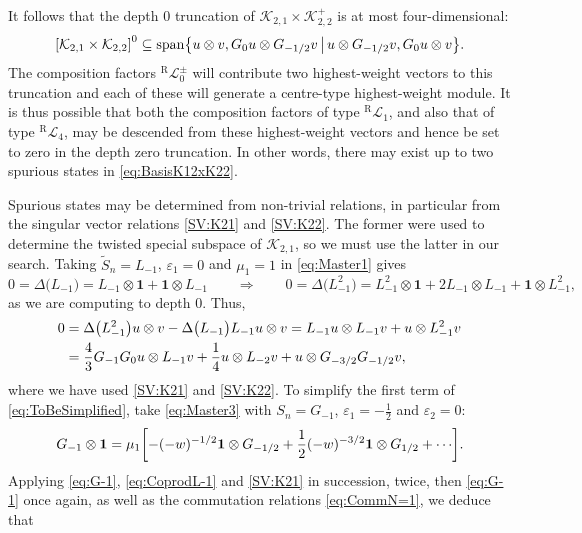 \documentclass[a4paper,reqno,12pt]{report}
\theoremstyle{definition}
\numberwithin{equation}{section}
\let\originalleft\left     %
\let\originalright\right
\renewcommand{\left}{\mathopen{}\mathclose\bgroup\originalleft}
\renewcommand{\right}{\aftergroup\egroup\originalright}
\newcommand{\sqbrac}[1]{\left[ #1 \right]}
\newcommand{\wun}{\mathbf{1}}  %
\newcommand{\Ra}{\Rightarrow}
\newcommand{\Irr}[1]{\mathcal{L}_{#1}}       %
\newcommand{\Kac}[1]{\mathcal{K}_{#1}}       %
\newcommand{\fuse}{\mathbin{\times}}                                            %
\newcommand{\coproductsymb}{\Delta}                                                %
\newcommand{\coproduct}[1]{\coproductsymb \bigl( #1 \bigr)}                        %
\newcommand{\hw}{highest-weight}
\newcommand{\sv}{singular vector}
\newcommand{\hwm}{\hw{} module}
\newcommand{\eps}{\varepsilon}
\newcommand{\tS}{\widetilde{S}}
\DeclareMathOperator{\vspn}{span}
\theoremstyle{plain}
\newcommand{\RIrr}[1]{{}^{\text{R}}\Irr{#1}}       %
\newcommand{\bfset}[2]{\left\{ #1 \, \middle\vert \, #2 \right\}} %
\newcommand{\hwvs}{\hw{} vectors}
\begin{document}
It follows that the depth $0$ truncation of $\Kac{2,1} \fuse \Kac{2,2}^+$ is at most four-dimensional:
\begin{equation} \label{eq:BasisK12xK22}
\sqbrac{\Kac{2,1} \fuse \Kac{2,2}}^0 \subseteq \vspn \bfset{u \otimes v, G_0 u \otimes G_{-1/2} v}{u\otimes  G_{-1/2}v, G_0 u \otimes v}.
\end{equation}
The composition factors $\RIrr{0}^{\pm}$ will contribute two \hwvs{} to this truncation and each of these will generate a centre-type \hwm{}.  It is thus possible that both the composition factors of type $\RIrr{1}$, and also that of type $\RIrr{4}$, may be descended from these \hwvs{} and hence be set to zero in the depth zero truncation.  In other words, there may exist up to two spurious states in \eqref{eq:BasisK12xK22}.

Spurious states may be determined from non-trivial relations, in particular from the \sv{} relations \eqref{SV:K21} and \eqref{SV:K22}.  The former were used to determine the twisted special subspace of $\Kac{2,1}$, so we must use the latter in our search.  Taking $\tS_n = L_{-1}$, $\eps_1 = 0$ and $\mu_1 = 1$ in \eqref{eq:Master1} gives
\begin{equation} \label{eq:CoprodL-1}
0 = \coproduct{L_{-1}} = L_{-1} \otimes \wun + \wun \otimes L_{-1} \qquad \Ra \qquad 
0 = \coproduct{L_{-1}^2} = L_{-1}^2 \otimes \wun + 2 L_{-1} \otimes L_{-1} + \wun \otimes L_{-1}^2,
\end{equation}
as we are computing to depth $0$.  Thus,
\begin{align} \label{eq:ToBeSimplified}
0 &= \coproduct{L_{-1}^2} u \otimes v - \coproduct{L_{-1}} L_{-1} u \otimes v = L_{-1} u \otimes L_{-1} v + u \otimes L_{-1}^2 v \notag \\
&= \frac{4}{3} G_{-1} G_0 u \otimes L_{-1} v + \frac{1}{4} u \otimes L_{-2} v + u \otimes G_{-3/2} G_{-1/2} v,
\end{align}
where we have used \eqref{SV:K21} and \eqref{SV:K22}.  To simplify the first term of \eqref{eq:ToBeSimplified}, take \eqref{eq:Master3} with $S_n = G_{-1}$, $\eps_1 = -\frac{1}{2}$ and $\eps_2 = 0$:
\begin{equation} \label{eq:G-1}
G_{-1} \otimes \wun = \mu_1 \sqbrac{-(-w)^{-1/2} \wun \otimes G_{-1/2} + \frac{1}{2} (-w)^{-3/2} \wun \otimes G_{1/2} + \cdots}.
\end{equation}
Applying \eqref{eq:G-1}, \eqref{eq:CoprodL-1} and \eqref{SV:K21} in succession, twice, then \eqref{eq:G-1} once again, as well as the commutation relations \eqref{eq:CommN=1}, we deduce that
\end{document}
